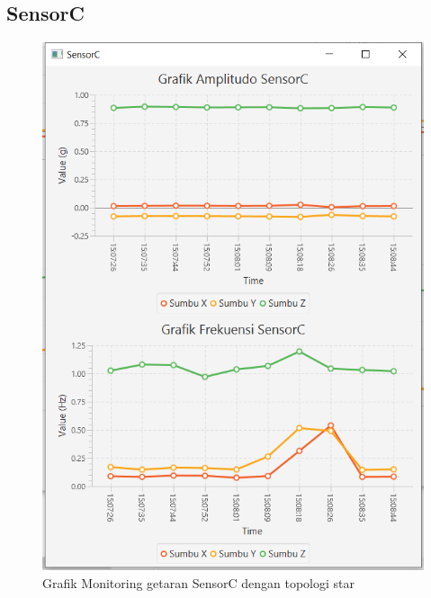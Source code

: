 \subsection{SensorC}
\begin{figure}[H] 
	\centering  
	\includegraphics[scale=1]{Lampiran/HasilPengujian/sensorC_star.PNG} 
	\caption[Grafik Monitoring getaran SensorC dengan topologi star]{Grafik Monitoring getaran SensorC dengan topologi star}
	\label{fig:grafik_C_star_paskal} 
\end{figure}

